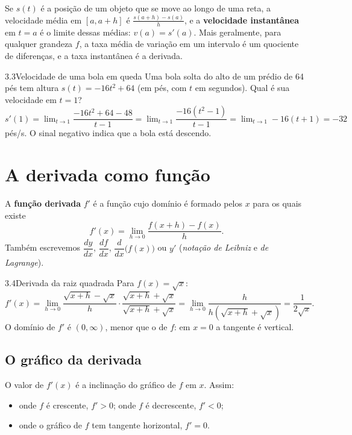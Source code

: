 Se $s(t)$ é a posição de um objeto que se move ao longo de uma reta, a velocidade média em
$[a,a+h]$ é $\frac{s(a+h)-s(a)}{h}$, e a \textbf{velocidade instantânea} em $t=a$ é o
limite dessas médias: $v(a)=s'(a)$. Mais geralmente, para qualquer grandeza $f$, a taxa
média de variação em um intervalo é um quociente de diferenças, e a taxa instantânea é a
derivada.

\begin{exemplo}{3.3}{Velocidade de uma bola em queda}
Uma bola solta do alto de um prédio de 64 pés tem altura $s(t)=-16t^2+64$ (em pés, com $t$
em segundos). Qual é sua velocidade em $t=1$?
\solucao
$s'(1)=\lim_{t\to1}\dfrac{-16t^2+64-48}{t-1}=\lim_{t\to1}\dfrac{-16(t^2-1)}{t-1}
=\lim_{t\to1}-16(t+1)=-32$ pés/s. O sinal negativo indica que a bola está descendo.
\end{exemplo}

\section{A derivada como função}

\begin{definicao}
A \textbf{função derivada} $f'$ é a função cujo domínio é formado pelos $x$ para os quais
existe
\[
f'(x)=\lim_{h\to0}\frac{f(x+h)-f(x)}{h}.
\]
Também escrevemos $\dfrac{dy}{dx}$, $\dfrac{df}{dx}$, $\dfrac{d}{dx}\big(f(x)\big)$ ou $y'$
(\emph{notação de Leibniz} e \emph{de Lagrange}).
\end{definicao}

\begin{exemplo}{3.4}{Derivada da raiz quadrada}
Para $f(x)=\sqrt x$:
\[
f'(x)=\lim_{h\to0}\frac{\sqrt{x+h}-\sqrt x}{h}\cdot\frac{\sqrt{x+h}+\sqrt x}{\sqrt{x+h}+\sqrt x}
=\lim_{h\to0}\frac{h}{h(\sqrt{x+h}+\sqrt x)}=\frac{1}{2\sqrt x}.
\]
O domínio de $f'$ é $(0,\infty)$, menor que o de $f$: em $x=0$ a tangente é vertical.
\end{exemplo}

\subsection{O gráfico da derivada}

O valor de $f'(x)$ é a inclinação do gráfico de $f$ em $x$. Assim:
\begin{itemize}
\item onde $f$ é crescente, $f'>0$; onde $f$ é decrescente, $f'<0$;
\item onde o gráfico de $f$ tem tangente horizontal, $f'=0$.
\end{itemize}

